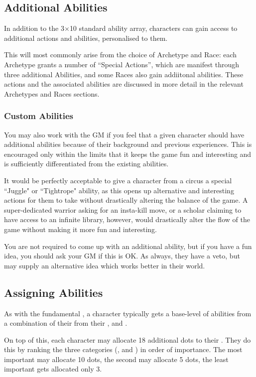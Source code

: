 \subsection{Additional Abilities}

In addition to the 3$\times$10 standard ability array, characters can gain access to additional actions and abilities, personalised to them. 

This will most commonly arise from the choice of Archetype and Race: each Archetype grants a number of ``Special Actions'', which are manifest through three additional Abilities, and some Races also gain addiitonal abilities. These actions and the associated abilities are discussed in more detail in the relevant Archetypes and Races sections. 


\subsubsection{Custom Abilities}
You may also work with the GM if you feel that a given character should have additional abilities because of their background and previous experiences. This is encouraged only within the limits that it keeps the game fun and interesting and is sufficiently differentiated from the existing abilities.

It would be perfectly acceptable to give a character from a circus a special ``Juggle" or ``Tightrope" ability, as this opens up alternative and interesting actions for them to take without drastically altering the balance of the game. A super-dedicated warrior asking for an insta-kill move, or a scholar claiming to have access to an infinite library, however, would drastically alter the flow of the game without making it more fun and interesting. 

You are not required to come up with an additional ability, but if you have a fun idea, you should ask your GM if this is OK. As always, they have a veto, but may supply an alternative idea which works better in their world. 

\subsection{Assigning Abilities}

As with the fundamental , a character typically gets a base-level of abilities from a combination of their  from their ,  and .

On top of this, each character may allocate 18 additional dots to their . They do this by ranking the three categories (,  and ) in order of importance. The most important may allocate 10 dots, the second may allocate 5 dots, the least important gets allocated only 3.

